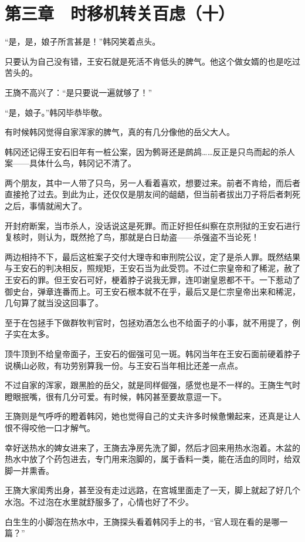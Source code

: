 \section{第三章　时移机转关百虑（十）}

“是，是，娘子所言甚是！”韩冈笑着点头。

只要认为自己没有错，王安石就是死活不肯低头的脾气。他这个做女婿的也是吃过苦头的。

王旖不高兴了：“是只要说一遍就够了！”

“是，娘子。”韩冈毕恭毕敬。

有时候韩冈觉得自家浑家的脾气，真的有几分像他的岳父大人。

韩冈还记得王安石旧年有一桩公案，因为鹩哥还是鹧鸪……反正是只鸟而起的杀人案——具体什么鸟，韩冈记不清了。

两个朋友，其中一人带了只鸟，另一人看着喜欢，想要过来。前者不肯给，而后者直接抢了过去。到此为止，还仅仅是朋友间的龃龉，但当前者拔出刀子将后者刺死之后，事情就闹大了。

开封府断案，当市杀人，没话说这是死罪。而正好担任纠察在京刑狱的王安石进行复核时，则认为，既然抢了鸟，那就是白日劫盗——杀强盗不当论死！

两边相持不下，最后这桩案子交付大理寺和审刑院公议，定了是杀人罪。既然结果与王安石的判决相反，照规矩，王安石当为此受罚。不过仁宗皇帝和了稀泥，赦了王安石的罪。但王安石可好，梗着脖子说我无罪，连叩谢皇恩都不干。一下惹动了御史台，弹章连番而上。可王安石根本就不在乎，最后又是仁宗皇帝出来和稀泥，几句算了就当没这回事了。

至于在包拯手下做群牧判官时，包拯劝酒怎么也不给面子的小事，就不用提了，例子实在太多。

顶牛顶到不给皇帝面子，王安石的倔强可见一斑。韩冈当年在王安石面前硬着脖子说横山必败，有功劳别算我一份。与王安石当年相比还差一点点。

不过自家的浑家，跟黑脸的岳父，就是同样倔强，感觉也是不一样的。王旖生气时瞪眼抿嘴，很有几分可爱。有时候，韩冈甚至要故意逗一下。

王旖则是气呼呼的瞪着韩冈，她也觉得自己的丈夫许多时候惫懒起来，还真是让人恨不得咬他一口才解气。

幸好送热水的婢女进来了，王旖去净房先洗了脚，然后才回来用热水泡着。木盆的热水中放了个药包进去，专门用来泡脚的，属于香料一类，能在活血的同时，给双脚一并熏香。

王旖大家闺秀出身，甚至没有走过远路，在宫城里面走了一天，脚上就起了好几个水泡。不过泡在水里就舒服多了，心情也好了不少。

白生生的小脚泡在热水中，王旖探头看着韩冈手上的书，“官人现在看的是哪一篇？”

